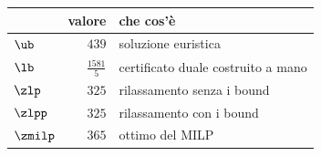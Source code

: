 \begin{center}\small
\begin{tabular}{lrl}
\toprule
 & valore & che cos'è \\
\midrule
$\ub$ & $439$ & soluzione euristica \\
$\lb$ & $\frac{1581}{5}$ & certificato duale costruito a mano \\
$\zlp$ & $325$ & rilassamento senza i bound \\
$\zlpp$ & $325$ & rilassamento con i bound \\
$\zmilp$ & $365$ & ottimo del MILP \\
\bottomrule
\end{tabular}
\end{center}

